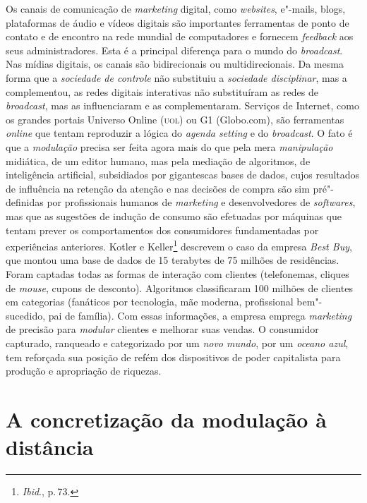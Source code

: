 Os canais de comunicação de \emph{marketing} digital, como
\emph{websites}, e"-mails, blogs, plataformas de áudio e vídeos digitais
são importantes ferramentas de ponto de contato e de encontro na rede
mundial de computadores e fornecem \emph{feedback} aos seus
administradores. Esta é a principal diferença para o mundo do
\emph{broadcast}. Nas mídias digitais, os canais são bidirecionais ou
multidirecionais. Da mesma forma que a \emph{sociedade de controle} não
substituiu a \emph{sociedade disciplinar}, mas a complementou, as redes
digitais interativas não substituíram as redes de \emph{broadcast}, mas
as influenciaram e as complementaram. Serviços de Internet, como os
grandes portais Universo Online (\textsc{uol}) ou G1 (Globo.com), são ferramentas
\emph{online} que tentam reproduzir a lógica do \emph{agenda setting} e
do \emph{broadcast}. O fato é que a \emph{modulação} precisa ser feita
agora mais do que pela mera \emph{manipulação} midiática, de um editor
humano, mas pela mediação de algoritmos, de inteligência artificial,
subsidiados por gigantescas bases de dados, cujos resultados de
influência na retenção da atenção e nas decisões de compra são sim
pré"-definidas por profissionais humanos de \emph{marketing} e
desenvolvedores de \emph{softwares}, mas que as sugestões de indução de
consumo são efetuadas por máquinas que tentam prever os comportamentos
dos consumidores fundamentadas por experiências anteriores. Kotler e
Keller\footnote{\emph{Ibid}., p.\,73.} descrevem o caso da empresa \emph{Best Buy}, que
montou uma base de dados de 15 terabytes de 75 milhões de residências.
Foram captadas todas as formas de interação com clientes (telefonemas,
cliques de \emph{mouse}, cupons de desconto). Algoritmos classificaram
100 milhões de clientes em categorias (fanáticos por tecnologia, mãe
moderna, profissional bem"-sucedido, pai de família). Com essas
informações, a empresa emprega \emph{marketing} de precisão para
\emph{modular} clientes e melhorar suas vendas. O consumidor capturado,
ranqueado e categorizado por um \emph{novo mundo}, por um \emph{oceano
azul}, tem reforçada sua posição de refém dos dispositivos de poder
capitalista para produção e apropriação de riquezas.

\section{A concretização da modulação à distância}

